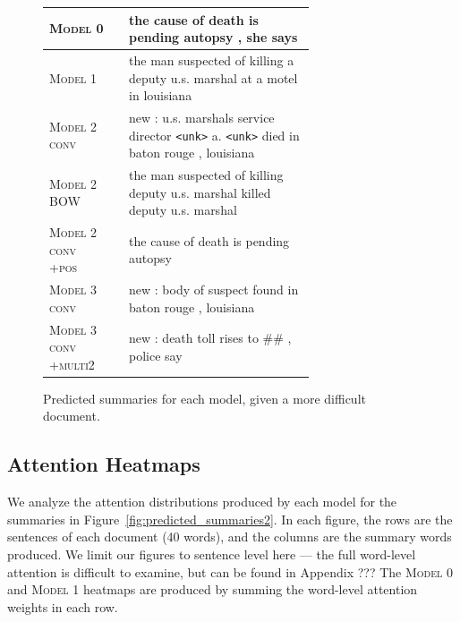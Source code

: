 \documentclass[12pt]{report}
\begin{document}
\begin{figure}[p]
\begin{tabular}{ll p{0.7\linewidth}}
\textsc{Model 0} & & the cause of death is pending autopsy , she says \\
\midrule
 \textsc{Model 1} & & the man suspected of killing a deputy u.s. marshal at a motel in louisiana \\
\midrule
\textsc{Model 2 conv} & & new : u.s. marshals service director \texttt{<unk>} a. \texttt{<unk>} died in baton rouge , louisiana \\
\textsc{Model 2 BOW} & &  the man suspected of killing deputy u.s. marshal killed deputy u.s. marshal \\
\textsc{Model 2 conv +pos} & & the cause of death is pending autopsy \\
\midrule
\textsc{Model 3 conv} & & new : body of suspect found in baton rouge , louisiana \\
\textsc{Model 3 conv +multi2} & &  new : death toll rises to \#\# , police say \\
\bottomrule
\end{tabular}
\caption{Predicted summaries for each model, given a more difficult document.}
\label{fig:predicted_summaries3}
\end{figure}



\subsection{Attention Heatmaps}
We analyze the attention distributions produced by each model for the summaries in Figure~\ref{fig:predicted_summaries2}.
In each figure, the rows are the sentences of each document (40 words), and the columns are the summary words produced.
We limit our figures to sentence level here --- the full word-level attention is difficult to examine, but can be found in Appendix ???
The \textsc{Model 0} and \textsc{Model 1} heatmaps are produced by summing the word-level attention weights in each row.
\end{document}
